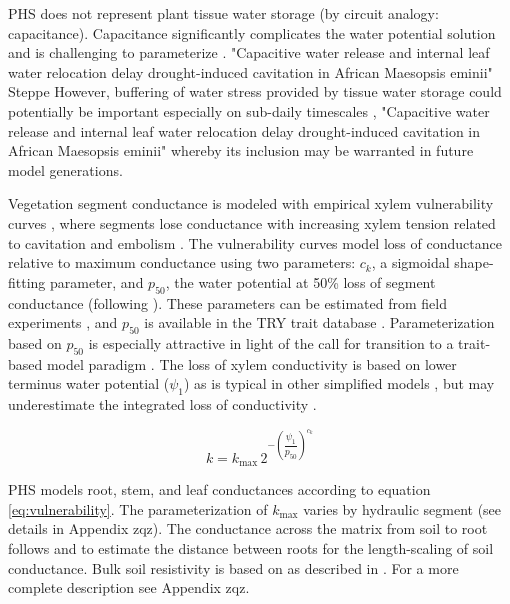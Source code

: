 \documentclass[draft,linenumbers]{agujournal}
\begin{document}
    PHS does not represent plant tissue water storage (by circuit analogy: capacitance). 
    Capacitance significantly complicates the water potential solution \citep{celia1990}
    and is challenging to parameterize \citep{bartlett2016}. "Capacitive water release and internal leaf water relocation delay drought-induced cavitation in African Maesopsis eminii" Steppe
    However, buffering of water stress provided by tissue water storage could potentially be important
    especially on sub-daily timescales \citep{meinzer2009}, "Capacitive water release and internal leaf water relocation delay drought-induced cavitation in African Maesopsis eminii" whereby its inclusion may be warranted 
    in future model generations.

     Vegetation segment conductance is modeled with empirical xylem vulnerability curves \citep{tyree1989}, 
     where segments lose conductance with increasing xylem tension related to 
     cavitation and embolism \citep{holbrook2001}.
     The vulnerability curves model loss of conductance relative to maximum conductance using two parameters: 
     $c_k$, a sigmoidal shape-fitting parameter, and 
     $p_{50}$, the water potential at 50\% loss of segment conductance (following \cite{gentine2016}). 
     These parameters can be estimated from field experiments \citep{sack2002}, 
     and $p_{50}$ is available in the TRY trait database \citep{kattge2011}.
     Parameterization based on $p_{50}$ is especially attractive in light of the call for transition to
     a trait-based model paradigm \citep{anderegg2015a}.
     The loss of xylem conductivity is based on lower terminus water potential ($\psi_1$)
     as is typical in other simplified models \citep{xu2016}, but 
     may underestimate the integrated loss of conductivity \citep{sperry2015}. 
         
     \begin{linenomath*}
     \begin{equation}
     \label{eq:vulnerability}
     k = k_{\text{max}} \, 2^{-\left(\dfrac{\psi_1}{p_{50}}\right)^{c_k}}
     \end{equation}
     \end{linenomath*}
     
     PHS models root, stem, and leaf conductances according to equation \ref{eq:vulnerability}.
     The parameterization of $k_{\text{max}}$ varies by hydraulic segment (see details in Appendix zqz).
     The conductance across the matrix from soil to root follows \citet{williams2001} and \citet{bonan2014} 
     to estimate the distance between roots for the length-scaling of soil conductance.
     Bulk soil resistivity is based on \citet{clapp1978} as described in \citet{oleson2013}.
     For a more complete description see Appendix zqz.
    
\end{document}
